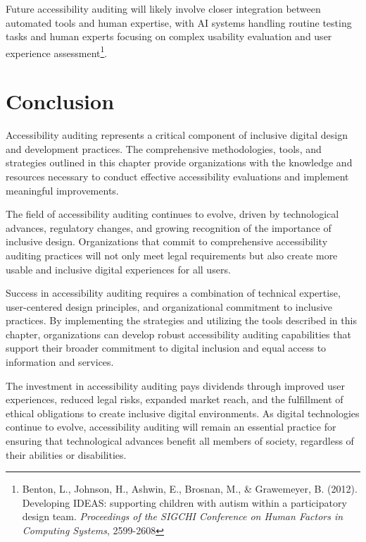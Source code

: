 Future accessibility auditing will likely involve closer integration between automated tools and human expertise, with AI systems handling routine testing tasks and human experts focusing on complex usability evaluation and user experience assessment\footnote{Benton, L., Johnson, H., Ashwin, E., Brosnan, M., \& Grawemeyer, B. (2012). Developing IDEAS: supporting children with autism within a participatory design team. \textit{Proceedings of the SIGCHI Conference on Human Factors in Computing Systems}, 2599-2608}.

\section{Conclusion}\label{sec:conclusion-audit}

Accessibility auditing represents a critical component of inclusive digital design and development practices. The comprehensive methodologies, tools, and strategies outlined in this chapter provide organizations with the knowledge and resources necessary to conduct effective accessibility evaluations and implement meaningful improvements.

The field of accessibility auditing continues to evolve, driven by technological advances, regulatory changes, and growing recognition of the importance of inclusive design. Organizations that commit to comprehensive accessibility auditing practices will not only meet legal requirements but also create more usable and inclusive digital experiences for all users.

Success in accessibility auditing requires a combination of technical expertise, user-centered design principles, and organizational commitment to inclusive practices. By implementing the strategies and utilizing the tools described in this chapter, organizations can develop robust accessibility auditing capabilities that support their broader commitment to digital inclusion and equal access to information and services.

The investment in accessibility auditing pays dividends through improved user experiences, reduced legal risks, expanded market reach, and the fulfillment of ethical obligations to create inclusive digital environments. As digital technologies continue to evolve, accessibility auditing will remain an essential practice for ensuring that technological advances benefit all members of society, regardless of their abilities or disabilities.

